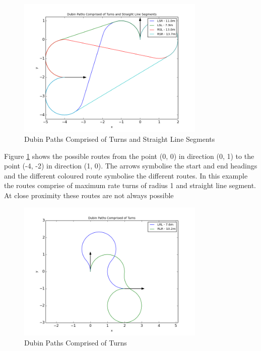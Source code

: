 \documentclass[a4paper,12pt,twoside]{article}
\begin{document}
\begin{figure}[H]
\centering
\includegraphics[width=0.8\textwidth]{figures/dubin_paths_comprised_of_turns_and_straight_line_segments.png} 
\caption{Dubin Paths Comprised of Turns and Straight Line Segments}
\label{fig:dubin_paths_comprised_of_turns_and_straight_line_segments}
\end{figure}

Figure \ref{fig:dubin_paths_comprised_of_turns_and_straight_line_segments} shows the possible routes from the point (0, 0) in direction (0, 1) to the point (-4, -2) in direction (1, 0). The arrows symbolise the start and end headings and the different coloured route symbolise the different routes. In this example the routes comprise of maximum rate turns of radius 1 and straight line segment. At close proximity these routes are not always possible

\begin{figure}[H]
\centering
\includegraphics[width=0.8\textwidth]{figures/dubin_paths_comprised_of_turns.png} 
\caption{Dubin Paths Comprised of Turns}
\label{fig:dubin_paths_comprised_of_turns}
\end{figure}
\end{document}
